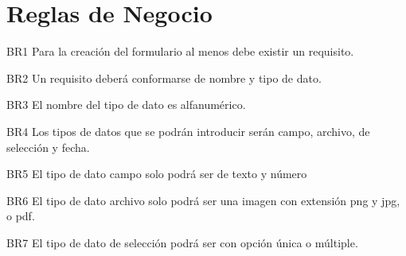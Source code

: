 \section{Reglas de Negocio}
\begin{BussinesRule}{BR1}{}
    \BRitem[Tipo:]
    \BRitem[Clase:]
    \BRitem[Nivel:]
    \BRitem[Descripción:]Para la creación del formulario  al menos debe existir un requisito.
    
\end{BussinesRule}
\begin{BussinesRule}{BR2}{}
    \BRitem[Tipo:]
    \BRitem[Clase:]
    \BRitem[Nivel:]
    \BRitem[Descripción:]Un requisito deberá conformarse de nombre y tipo de dato.
    
\end{BussinesRule}
\begin{BussinesRule}{BR3}{}
    \BRitem[Tipo:]
    \BRitem[Clase:]
    \BRitem[Nivel:]
    \BRitem[Descripción:]El nombre del tipo de dato es alfanumérico.
    
\end{BussinesRule}
\begin{BussinesRule}{BR4}{}
    \BRitem[Tipo:]
    \BRitem[Clase:]
    \BRitem[Nivel:]
    \BRitem[Descripción:]Los tipos de datos que se podrán introducir serán campo, archivo, de selección y fecha. 
    
\end{BussinesRule}
\begin{BussinesRule}{BR5}{}
    \BRitem[Tipo:]
    \BRitem[Clase:]
    \BRitem[Nivel:]
    \BRitem[Descripción:]El tipo de dato campo solo podrá ser de texto y número
    
\end{BussinesRule}
\begin{BussinesRule}{BR6}{}
    \BRitem[Tipo:]
    \BRitem[Clase:]
    \BRitem[Nivel:]
    \BRitem[Descripción:]El tipo de dato archivo solo podrá ser una imagen con extensión png y jpg, o  pdf.
    
\end{BussinesRule}
\begin{BussinesRule}{BR7}{}
    \BRitem[Tipo:]
    \BRitem[Clase:]
    \BRitem[Nivel:]
    \BRitem[Descripción:]El tipo de dato de selección podrá ser con opción única o múltiple.
    
\end{BussinesRule}
